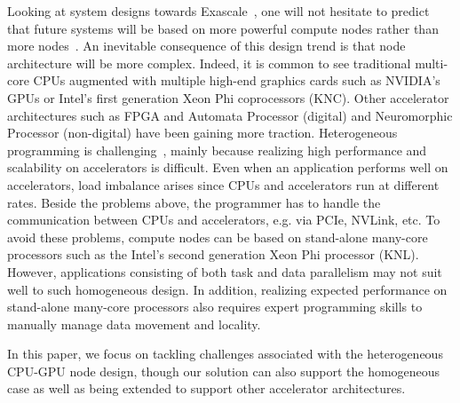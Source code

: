 Looking at system designs towards Exascale~\cite{top500}, one will not hesitate to predict that future systems will be based on more powerful compute nodes rather than more nodes~\cite{Shalf:exascaleChallenges}.  
An inevitable consequence of this design trend is that node architecture will be more complex.
Indeed, it is common to see traditional multi-core CPUs augmented with multiple high-end graphics cards such as NVIDIA's GPUs or Intel's first generation Xeon Phi coprocessors (KNC).
Other accelerator architectures such as FPGA and Automata Processor (digital) and Neuromorphic Processor (non-digital) have been gaining more traction.
Heterogeneous programming is challenging~\cite{exascaleRoadMap}, mainly because realizing high performance and scalability on accelerators is difficult.
Even when an application performs well on accelerators, load imbalance arises since CPUs and accelerators run at different rates.
Beside the problems above, the programmer has to handle the communication between CPUs and accelerators, e.g. via PCIe, NVLink, etc.
To avoid these problems, compute nodes can be based on stand-alone many-core processors such as the Intel's second generation Xeon Phi processor (KNL).
However, applications consisting of both task and data parallelism may not suit well to such homogeneous design.
In addition, realizing expected performance on stand-alone many-core processors also requires expert programming skills
to manually manage data movement and locality.





In this paper, we focus on tackling challenges associated with the heterogeneous CPU-GPU node design, though our solution can also support the homogeneous case as well as being extended to support other accelerator architectures.
